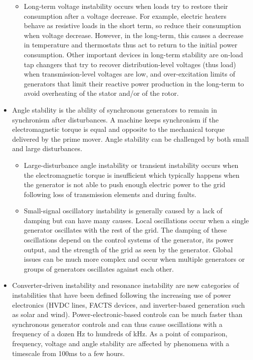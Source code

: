 \begin{itemize}
\begin{itemize}
        \item Long-term voltage instability occurs when loads try to restore their consumption after a voltage decrease. For example, electric heaters behave as resistive loads in the short term, so reduce their consumption when voltage decrease. However, in the long-term, this causes a decrease in temperature and thermostats thus act to return to the initial power consumption. Other important devices in long-term stability are on-load tap changers that try to recover distribution-level voltages (thus load) when transmission-level voltages are low, and over-excitation limits of generators that limit their reactive power production in the long-term to avoid overheating of the stator and/or of the rotor.
    \end{itemize}
    \item Angle stability is the ability of synchronous generators to remain in synchronism after disturbances. A machine keeps synchronism if the electromagnetic torque is equal and opposite to the mechanical torque delivered by the prime mover. Angle stability can be challenged by both small and large disturbances.
    \begin{itemize}
        \item Large-disturbance angle instability or transient instability occurs when the electromagnetic torque is insufficient which typically happens when the generator is not able to push enough electric power to the grid following loss of transmission elements and during faults.
        \item Small-signal oscillatory instability is generally caused by a lack of damping but can have many causes. Local oscillations occur when a single generator oscillates with the rest of the grid. The damping of these oscillations depend on the control systems of the generator, its power output, and the strength of the grid as seen by the generator. Global issues can be much more complex and occur when multiple generators or groups of generators oscillates against each other.
    \end{itemize}
    \item Converter-driven instability and resonance instability are new categories of instabilities that have been defined following the increasing use of power electronics (HVDC lines, FACTS devices, and inverter-based generation such as solar and wind). Power-electronic-based controls can be much faster than synchronous generator controls and can thus cause oscillations with a frequency of a dozen Hz to hundreds of kHz. As a point of comparison, frequency, voltage and angle stability are affected by phenomena with a timescale from 100ms to a few hours.
\end{itemize}

